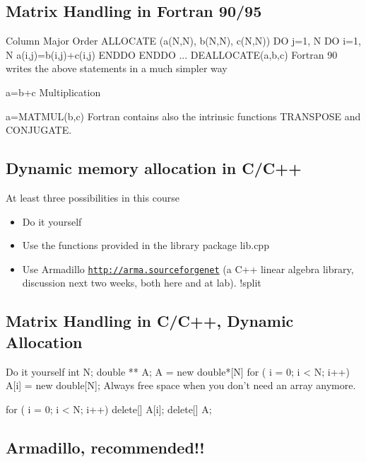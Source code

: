 \documentclass[%
twoside,                 %
final,                   %
10pt]{article}
\begin{document}
\subsection{Matrix Handling in Fortran 90/95}

\begin{block}{Column Major Order }
\bfcod
   ALLOCATE (a(N,N), b(N,N), c(N,N))
   DO j=1,  N
      DO i=1, N
         a(i,j)=b(i,j)+c(i,j)
      ENDDO
   ENDDO
   ...
   DEALLOCATE(a,b,c)
\efcod
Fortran 90 writes the above statements in a much simpler way

\bfcod
   a=b+c
\efcod
Multiplication

\bfcod
   a=MATMUL(b,c)
\efcod
Fortran contains also the intrinsic functions TRANSPOSE and CONJUGATE.
\end{block}

\subsection{Dynamic memory allocation in C/C++}

At least three possibilities in this course

\begin{itemize}
  \item Do it yourself

  \item Use the functions provided in the library package lib.cpp

  \item Use Armadillo \href{{http://arma.sourceforgenet}}{\nolinkurl{http://arma.sourceforgenet}} (a C++ linear algebra library, discussion next two weeks, both here and at lab). !split
\end{itemize}

\noindent
\subsection{Matrix Handling in C/C++, Dynamic Allocation}

\begin{block}{Do it yourself }
\bcppcod
int N;
double **  A;
A = new double*[N]
for ( i = 0; i < N; i++)
    A[i] = new double[N];
\ecppcod
Always free space when you don't need an array anymore.

\bcppcod
for ( i = 0; i < N; i++)
    delete[] A[i];
delete[] A;
\ecppcod
\end{block}

\subsection{Armadillo, recommended!!}
\end{document}
